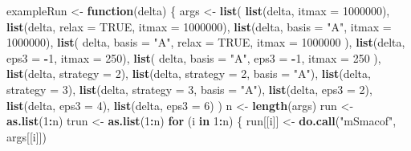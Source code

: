 \documentclass[
  12pt,
]{article}
\newenvironment{Shaded}{\begin{snugshade}}{\end{snugshade}}
\newcommand{\AttributeTok}[1]{\textcolor[rgb]{0.13,0.29,0.53}{#1}}
\newcommand{\ConstantTok}[1]{\textcolor[rgb]{0.56,0.35,0.01}{#1}}
\newcommand{\ControlFlowTok}[1]{\textcolor[rgb]{0.13,0.29,0.53}{\textbf{#1}}}
\newcommand{\DecValTok}[1]{\textcolor[rgb]{0.00,0.00,0.81}{#1}}
\newcommand{\FunctionTok}[1]{\textcolor[rgb]{0.13,0.29,0.53}{\textbf{#1}}}
\newcommand{\NormalTok}[1]{#1}
\newcommand{\OtherTok}[1]{\textcolor[rgb]{0.56,0.35,0.01}{#1}}
\newcommand{\SpecialCharTok}[1]{\textcolor[rgb]{0.81,0.36,0.00}{\textbf{#1}}}
\newcommand{\StringTok}[1]{\textcolor[rgb]{0.31,0.60,0.02}{#1}}
\begin{document}
\begin{Shaded}
\begin{Highlighting}[]
\NormalTok{exampleRun }\OtherTok{\textless{}{-}} \ControlFlowTok{function}\NormalTok{(delta) \{}
\NormalTok{  args }\OtherTok{\textless{}{-}} \FunctionTok{list}\NormalTok{(}
    \FunctionTok{list}\NormalTok{(delta, }\AttributeTok{itmax =} \DecValTok{1000000}\NormalTok{),}
    \FunctionTok{list}\NormalTok{(delta, }\AttributeTok{relax =} \ConstantTok{TRUE}\NormalTok{, }\AttributeTok{itmax =} \DecValTok{1000000}\NormalTok{),}
    \FunctionTok{list}\NormalTok{(delta, }\AttributeTok{basis =} \StringTok{"A"}\NormalTok{, }\AttributeTok{itmax =} \DecValTok{1000000}\NormalTok{),}
    \FunctionTok{list}\NormalTok{(}
\NormalTok{      delta,}
      \AttributeTok{basis =} \StringTok{"A"}\NormalTok{,}
      \AttributeTok{relax =} \ConstantTok{TRUE}\NormalTok{,}
      \AttributeTok{itmax =} \DecValTok{1000000}
\NormalTok{    ),}
    \FunctionTok{list}\NormalTok{(delta, }\AttributeTok{eps3 =} \SpecialCharTok{{-}}\DecValTok{1}\NormalTok{, }\AttributeTok{itmax =} \DecValTok{250}\NormalTok{),}
    \FunctionTok{list}\NormalTok{(}
\NormalTok{      delta,}
      \AttributeTok{basis =} \StringTok{"A"}\NormalTok{,}
      \AttributeTok{eps3 =} \SpecialCharTok{{-}}\DecValTok{1}\NormalTok{,}
      \AttributeTok{itmax =} \DecValTok{250}
\NormalTok{    ),}
    \FunctionTok{list}\NormalTok{(delta, }\AttributeTok{strategy =} \DecValTok{2}\NormalTok{),}
    \FunctionTok{list}\NormalTok{(delta, }\AttributeTok{strategy =} \DecValTok{2}\NormalTok{, }\AttributeTok{basis =} \StringTok{"A"}\NormalTok{),}
    \FunctionTok{list}\NormalTok{(delta, }\AttributeTok{strategy =} \DecValTok{3}\NormalTok{),}
    \FunctionTok{list}\NormalTok{(delta, }\AttributeTok{strategy =} \DecValTok{3}\NormalTok{, }\AttributeTok{basis =} \StringTok{"A"}\NormalTok{),}
    \FunctionTok{list}\NormalTok{(delta, }\AttributeTok{eps3 =} \DecValTok{2}\NormalTok{),}
    \FunctionTok{list}\NormalTok{(delta, }\AttributeTok{eps3 =} \DecValTok{4}\NormalTok{),}
    \FunctionTok{list}\NormalTok{(delta, }\AttributeTok{eps3 =} \DecValTok{6}\NormalTok{)}
\NormalTok{  )}
\NormalTok{  n }\OtherTok{\textless{}{-}} \FunctionTok{length}\NormalTok{(args)}
\NormalTok{  run }\OtherTok{\textless{}{-}} \FunctionTok{as.list}\NormalTok{(}\DecValTok{1}\SpecialCharTok{:}\NormalTok{n)}
\NormalTok{  trun }\OtherTok{\textless{}{-}} \FunctionTok{as.list}\NormalTok{(}\DecValTok{1}\SpecialCharTok{:}\NormalTok{n)}
  \ControlFlowTok{for}\NormalTok{ (i }\ControlFlowTok{in} \DecValTok{1}\SpecialCharTok{:}\NormalTok{n) \{}
\NormalTok{    run[[i]] }\OtherTok{\textless{}{-}} \FunctionTok{do.call}\NormalTok{(}\StringTok{"mSmacof"}\NormalTok{, args[[i]])}

\end{Highlighting}
\end{Shaded}
\end{document}
